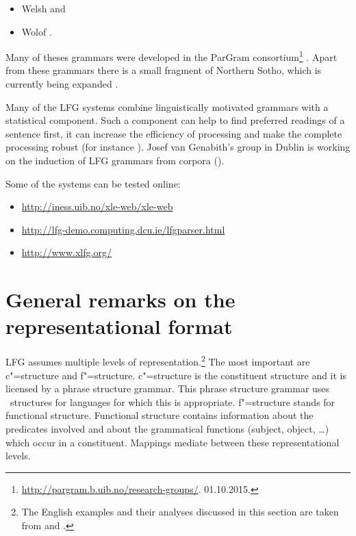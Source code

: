 \begin{itemize}
\item Welsh \citep{MS2005a-u}
and
\item Wolof \citep{Dione2012b-u,Dione2013a-u}.
\end{itemize}
Many of theses grammars were developed in the ParGram consortium\footnote{
  \url{http://pargram.b.uib.no/research-groups/}. 01.10.2015.
} \citep*{BKNS99a-ed,BDKMR02a-u}. Apart from these grammars there is a small fragment of Northern
Sotho, which is currently being expanded \citep{Faasz2010a-u}. 


Many of the LFG systems combine linguistically motivated grammars with a statistical
component. Such a component can help to find preferred readings of a sentence first,
it can increase the efficiency of processing and make the complete processing robust (for instance
\citealp{KRKMVC2004a-u,RKKCMJ2002a-u}). Josef van Genabith's group in Dublin is working on the induction of
LFG grammars from corpora (\eg \citealp{JGCCR99a-u,DBCGW2005a-u,CBFDRCW2005a-u,CG2006a-u,GWG2007a-u,CBDRGW2008a-u,SG2009a-u}). 

\pagebreak
Some of the systems can be tested online:
\begin{itemize}
\item \url{http://iness.uib.no/xle-web/xle-web}

\item \url{http://lfg-demo.computing.dcu.ie/lfgparser.html}
\item \url{http://www.xlfg.org/}
\end{itemize}




\section{General remarks on the representational format}
\label{Abschnitt-Format-LFG}

LFG assumes multiple levels of representation.\footnote{
	The English examples and their analyses discussed in this section are taken from
        \citet{Dalrymple2001a-u} and \citet{Dalrymple2006a}.
} The most important are c"=structure and f"=structure. c"=structure is the constituent
structure and it is licensed by a phrase structure grammar. This phrase structure grammar uses
\xbar~structures for languages for which this is appropriate. f"=structure stands for functional structure. Functional structure contains information about the predicates involved
and about the grammatical functions (subject, object, \ldots) which occur in a constituent. Mappings
mediate between these representational levels.



